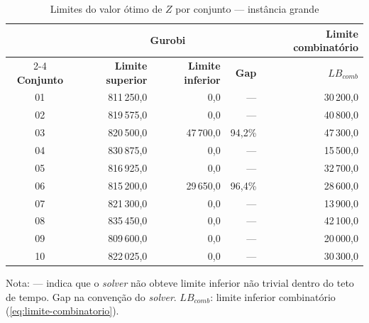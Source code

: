 \begin{table}[htbp]
    \caption{Limites do valor ótimo de $Z$ por conjunto --- instância grande}
    \label{tab:res-limites-grande}
    \centering
    \begin{tabular}{crrrr}
        \hline
        & \multicolumn{3}{c}{\textbf{Gurobi}} & \textbf{Limite combinatório} \\
        \cline{2-4} \cline{5-5}
        \textbf{Conjunto} & \textbf{Limite superior} & \textbf{Limite inferior} & \textbf{Gap} & \textbf{$LB_{comb}$} \\
        \hline
        01 & 811\,250,0 & 0,0 & --- & 30\,200,0 \\
        02 & 819\,575,0 & 0,0 & --- & 40\,800,0 \\
        03 & 820\,500,0 & 47\,700,0 & 94,2\% & 47\,300,0 \\
        04 & 830\,875,0 & 0,0 & --- & 15\,500,0 \\
        05 & 816\,925,0 & 0,0 & --- & 32\,700,0 \\
        06 & 815\,200,0 & 29\,650,0 & 96,4\% & 28\,600,0 \\
        07 & 821\,300,0 & 0,0 & --- & 13\,900,0 \\
        08 & 835\,450,0 & 0,0 & --- & 42\,100,0 \\
        09 & 809\,600,0 & 0,0 & --- & 20\,000,0 \\
        10 & 822\,025,0 & 0,0 & --- & 30\,300,0 \\
        \hline
    \end{tabular}
    \par\smallskip
    {\footnotesize Nota: --- indica que o \textit{solver} não obteve limite inferior não trivial dentro do teto de tempo. Gap na convenção do \textit{solver}. $LB_{comb}$: limite inferior combinatório (\autoref{eq:limite-combinatorio}).}
\end{table}

